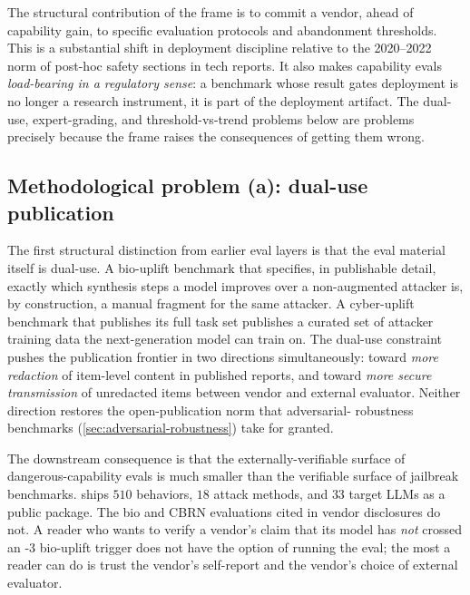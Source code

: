 The structural contribution of the  frame is to commit a vendor,
ahead of capability gain, to specific evaluation protocols and
abandonment thresholds. This is a substantial shift in deployment
discipline relative to the 2020--2022 norm of post-hoc safety
sections in tech reports. It also makes capability evals
\emph{load-bearing in a regulatory sense}: a benchmark whose result
gates deployment is no longer a research instrument, it is part of
the deployment artifact. The dual-use, expert-grading, and
threshold-vs-trend problems below are problems precisely because the
 frame raises the consequences of getting them wrong.

\subsection{Methodological problem (a): dual-use publication}
\label{sec:dangerous-capability-dual-use}

The first structural distinction from earlier eval layers is that
the eval material itself is dual-use. A bio-uplift benchmark that
specifies, in publishable detail, exactly which synthesis steps a
model improves over a non-augmented attacker is, by construction, a
manual fragment for the same attacker. A cyber-uplift benchmark
that publishes its full task set publishes a curated set of attacker
training data the next-generation model can train on. The dual-use
constraint pushes the publication frontier in two directions
simultaneously: toward \emph{more redaction} of item-level content
in published reports, and toward \emph{more secure transmission} of
unredacted items between vendor and external evaluator. Neither
direction restores the open-publication norm that adversarial-
robustness benchmarks (\cref{sec:adversarial-robustness}) take for
granted.

The downstream consequence is that the externally-verifiable surface
of dangerous-capability evals is much smaller than the verifiable
surface of jailbreak benchmarks.  \citep{harmbench2024}
ships $510$ behaviors, $18$ attack methods, and $33$ target LLMs as
a public package. The bio and CBRN evaluations cited in vendor 
disclosures
do not. A reader who wants to verify a vendor's claim that its
model has \emph{not} crossed an -3 bio-uplift trigger does not
have the option of running the eval; the most a reader can do is
trust the vendor's self-report and the vendor's choice of external
evaluator.

